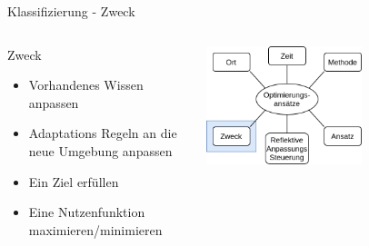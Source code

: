\documentclass[de,16:9]{sdqbeamer}
\begin{document}
\begin{frame}{Klassifizierung - Zweck}
	\begin{columns}
		 \begin{center}
			\begin{greenblock}{Zweck}
				\begin{itemize}
					\item Vorhandenes Wissen anpassen
					\item Adaptations Regeln an die neue Umgebung anpassen
					\item Ein Ziel erfüllen
					\item Eine Nutzenfunktion maximieren/minimieren
				\end{itemize}
			\end{greenblock}
		\end{center}
		 \begin{center}
			\includegraphics[width=0.6\textwidth]{sources/ClassificationProposal-Proposal_DE_Purpose.png}
		\end{center}
	\end{columns}
\end{frame}
\end{document}
